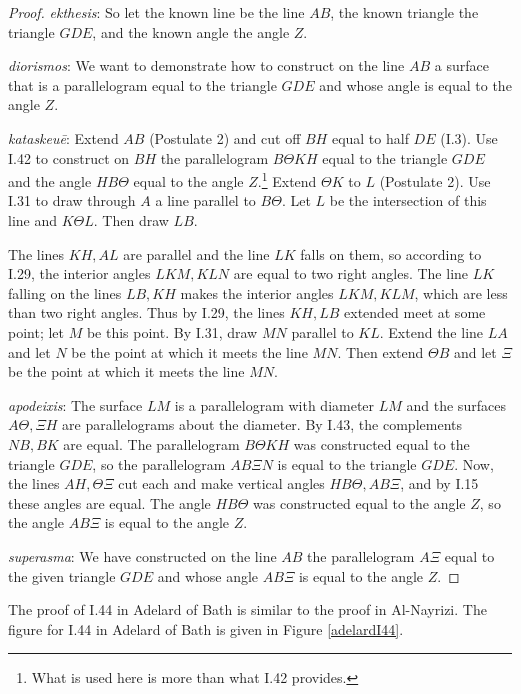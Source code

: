 \documentclass{article}
\begin{document}
\begin{proof}
{\em ekthesis}: So let the known line be the line $AB$, the known triangle the triangle $GDE$, and the known 
angle the angle $Z$.

{\em diorismos}: We want to demonstrate how to construct on the line $AB$ a surface that is a parallelogram
equal to the triangle $GDE$ and whose angle is equal to the angle $Z$.

{\em kataskeu\={e}}: Extend $AB$ (Postulate 2) and 
cut off $BH$ equal to half $DE$ (I.3). 
Use I.42 to construct on $BH$ the parallelogram
$B\Theta KH$ equal to the triangle $GDE$ and the angle $HB\Theta$ equal to the angle
$Z$.\footnote{What is used here is more than what I.42 provides.}
Extend $\Theta K$ to $L$ (Postulate 2). 
Use I.31 to draw through $A$ a line parallel to $B\Theta$. Let $L$ be 
the
intersection of this line and 
$K\Theta L$. Then draw $LB$.

The lines $KH,AL$ are parallel and the line $LK$ falls on them, so according to I.29, 
the interior angles $LKM,KLN$ are equal to two right angles. 
The line $LK$ falling on the lines $LB,KH$ makes the interior angles
$LKM,KLM$, which are less than two right angles. Thus by I.29, the lines $KH,LB$ extended
meet at some point; let $M$ be this point. 
By I.31, draw $MN$ parallel to $KL$. Extend the line $LA$ and let $N$ be the point at which it meets the line $MN$.
Then extend $\Theta B$ and let $\Xi$ be the point at which it meets the line $MN$.

{\em apodeixis}: The surface $LM$ is a parallelogram with diameter $LM$ and the surfaces $A\Theta,\Xi H$ are parallelograms about the diameter. 
By I.43, the complements $NB,BK$ are equal. The parallelogram $B\Theta KH$ was constructed
equal to the triangle $GDE$, so 
the parallelogram  $AB\Xi N$ is equal to the triangle $GDE$.
Now, the lines $AH,\Theta\Xi$ cut each and make vertical angles 
$HB\Theta,AB\Xi$, and by I.15 these angles are equal.
The angle $HB\Theta$ was constructed equal to the angle $Z$, so
the angle $AB\Xi$ is equal to the angle $Z$.

{\em superasma}: We have constructed on the line $AB$ the parallelogram $A\Xi$ equal
to the given triangle $GDE$ and whose angle $AB\Xi$ is equal to the angle $Z$.
\end{proof}

The proof of I.44 in Adelard of Bath \cite[pp.~66--67]{adelardI} is similar to the proof in Al-Nayrizi. The figure for I.44 in Adelard of Bath
is given in Figure \ref{adelardI44}.
\end{document}
